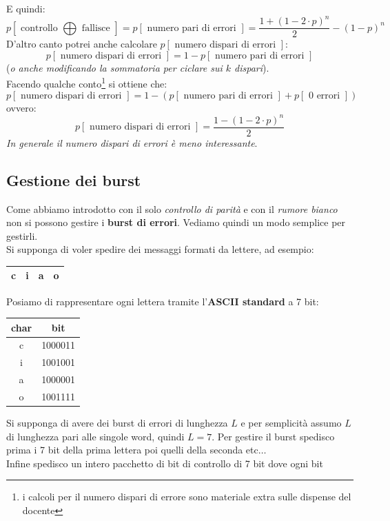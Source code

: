 \documentclass[a4paper,12pt, oneside]{book}
\begin{document}
E quindi:
{\small{\[p[\mbox{ controllo }\bigoplus \mbox{ fallisce }]=p[\mbox{ numero pari
        di errori }]=\frac{1+(1-2\cdot p)^n}{2}-(1-p)^n\]}}
D'altro canto potrei anche calcolare $p[\mbox{ numero dispari di errori }]$:
\[p[\mbox{ numero dispari di errori }]=1-p[\mbox{ numero pari di errori }]\]
(\textit{o anche modificando la sommatoria per ciclare sui $k$ dispari}).\\
Facendo qualche conto\footnote{i calcoli
  per il numero dispari di errore sono materiale extra sulle dispense del
  docente} si ottiene che: 
\[p[\mbox{ numero dispari di errori }]=1-(p[\mbox{ numero pari di errori
  }]+p[\mbox{ 0 errori }])\]
ovvero:
\[p[\mbox{ numero dispari di errori }]=\frac{1-(1-2\cdot p)^n}{2}\]
\textit{In generale il numero dispari di errori è meno interessante}.\\
\subsection{Gestione dei burst}
Come abbiamo introdotto con il solo \textit{controllo di parità} e con
il \textit{rumore bianco} non si possono gestire i \textbf{burst di
  errori}. Vediamo quindi un modo semplice per gestirli.\\
Si supponga di voler spedire dei messaggi formati da lettere, ad esempio:
\begin{table}[H]
  \centering
  \begin{tabular}{|c|c|c|c|}
    \hline
    c&i&a&o\\
    \hline
  \end{tabular}
\end{table}
Posiamo di rappresentare ogni lettera tramite l'\textbf{ASCII standard} a 7 bit:
\begin{table}[H]
  \centering
  \begin{tabular}{c|c}
    char & bit\\
    \hline
    c&1000011\\
    i&1001001\\
    a&1000001\\
    o&1001111
  \end{tabular}
\end{table}
Si supponga di avere dei burst di errori di lunghezza $L$ e per semplicità
assumo $L$ di lunghezza pari alle singole word, quindi $L=7$. Per gestire il
burst spedisco prima i 7 bit della prima lettera poi quelli della seconda
etc$\ldots$\\
Infine spedisco un intero pacchetto di bit di controllo di 7 bit dove ogni bit
\end{document}
